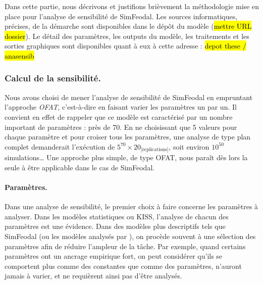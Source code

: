 Dans cette partie, nous décrivons et justifions brièvement la méthodologie mise en place pour l'analyse de sensibilité de SimFeodal.
Les sources informatiques, précises, de la démarche sont disponibles dans le dépôt du modèle (\hl{mettre URL dossier}).
Le détail des paramètres, les outputs du modèle, les traitements et les sorties graphiques sont disponibles quant à eux à cette adresse : \hl{depot these / anasensib}

\subsubsection{Calcul de la sensibilité.}

Nous avons choisi de mener l'analyse de sensibilité de SimFeodal en empruntant l'approche \textit{OFAT}, c'est-à-dire en faisant varier les paramètres un par un.
Il convient en effet de rappeler que ce modèle est caractérisé par un nombre important de paramètres : près de 70.
En ne choisissant que 5 valeurs pour chaque paramètre et pour croiser tous les paramètres, une analyse de type plan complet demanderait l'exécution de $5^{70} \times 20_{\text{[replications]}}$, soit environ $10^{50}$ simulations\ldots{}
Une approche plus simple, de type OFAT, nous paraît dès lors la seule  à être applicable dans le cas de SimFeodal.


\paragraph{Paramètres.}
Dans une analyse de sensibilité, le premier choix à faire concerne les paramètres à analyser.
Dans les modèles statistiques ou KISS, l'analyse de chacun des paramètres est une évidence.
Dans des modèles plus descriptifs tels que SimFeodal (ou les modèles analysés par \textcite{hirtzel2015exploration}), on procède souvent à une sélection des paramètres afin de réduire l'ampleur de la tâche.
Par exemple, quand certains paramètres ont un ancrage empirique fort, on peut considérer qu'ils se comportent plus comme des constantes que comme des paramètres, n'auront jamais à varier, et ne requièrent ainsi pas d'être analysés.

